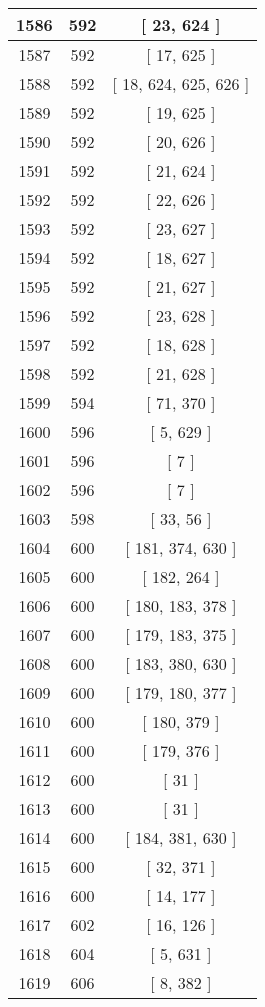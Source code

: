 \begin{center}
\begin{longtable}[H]{|| c c c ||}
\hline
1586 & 592 & [ 23, 624 ] \\ 
\hline
1587 & 592 & [ 17, 625 ] \\ 
\hline
1588 & 592 & [ 18, 624, 625, 626 ] \\ 
\hline
1589 & 592 & [ 19, 625 ] \\ 
\hline
1590 & 592 & [ 20, 626 ] \\ 
\hline
1591 & 592 & [ 21, 624 ] \\ 
\hline
1592 & 592 & [ 22, 626 ] \\ 
\hline
1593 & 592 & [ 23, 627 ] \\ 
\hline
1594 & 592 & [ 18, 627 ] \\ 
\hline
1595 & 592 & [ 21, 627 ] \\ 
\hline
1596 & 592 & [ 23, 628 ] \\ 
\hline
1597 & 592 & [ 18, 628 ] \\ 
\hline
1598 & 592 & [ 21, 628 ] \\ 
\hline
1599 & 594 & [ 71, 370 ] \\ 
\hline
1600 & 596 & [ 5, 629 ] \\ 
\hline
1601 & 596 & [ 7 ] \\ 
\hline
1602 & 596 & [ 7 ] \\ 
\hline
1603 & 598 & [ 33, 56 ] \\ 
\hline
1604 & 600 & [ 181, 374, 630 ] \\ 
\hline
1605 & 600 & [ 182, 264 ] \\ 
\hline
1606 & 600 & [ 180, 183, 378 ] \\ 
\hline
1607 & 600 & [ 179, 183, 375 ] \\ 
\hline
1608 & 600 & [ 183, 380, 630 ] \\ 
\hline
1609 & 600 & [ 179, 180, 377 ] \\ 
\hline
1610 & 600 & [ 180, 379 ] \\ 
\hline
1611 & 600 & [ 179, 376 ] \\ 
\hline
1612 & 600 & [ 31 ] \\ 
\hline
1613 & 600 & [ 31 ] \\ 
\hline
1614 & 600 & [ 184, 381, 630 ] \\ 
\hline
1615 & 600 & [ 32, 371 ] \\ 
\hline
1616 & 600 & [ 14, 177 ] \\ 
\hline
1617 & 602 & [ 16, 126 ] \\ 
\hline
1618 & 604 & [ 5, 631 ] \\ 
\hline
1619 & 606 & [ 8, 382 ] \\ 

\end{longtable}
\end{center}
